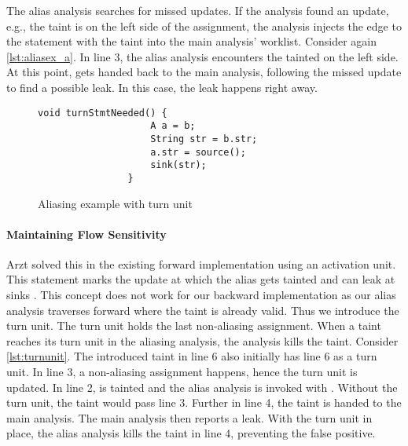 \documentclass[../draft.tex]{subfiles}
\begin{document}
    The alias analysis searches for missed updates. 
    If the analysis found an update, e.g., the taint is on the left side of the assignment, the analysis injects the edge to the statement with the taint into the main analysis' worklist. 
    Consider again \autoref{lst:aliasex_a}. 
    In line 3, the alias analysis encounters the tainted  on the left side. 
    At this point,  gets handed back to the main analysis, following the missed update to find a possible leak. In this case, the leak happens right away.

    \begin{figure}[tbp]
        \centering
        \begin{adjustbox}{max width=\columnwidth}
            \begin{lstlisting}[gobble=16]
                void turnStmtNeeded() {
                    A a = b;
                    String str = b.str;
                    a.str = source();
                    sink(str);
                }
            \end{lstlisting}
        \end{adjustbox}
        \caption{Aliasing example with turn unit}
        \label{lst:turnunit}
    \end{figure}

    \paragraph{Maintaining Flow Sensitivity}
    Arzt solved this in the existing forward implementation using an activation unit.
    This statement marks the update at which the alias gets tainted and can leak at sinks \cite{Arzt2017PhD}. 
    This concept does not work for our backward implementation as our alias analysis traverses forward where the taint is already valid. 
    Thus we introduce the turn unit. 
    The turn unit holds the last non-aliasing assignment. 
    When a taint reaches its turn unit in the aliasing analysis, the analysis kills the taint. 
    Consider \autoref{lst:turnunit}. 
    The introduced taint  in line 6 also initially has line 6 as a turn unit. 
    In line 3, a non-aliasing assignment happens, hence the turn unit is updated. 
    In line 2,  is tainted and the alias analysis is invoked with . 
    Without the turn unit, the taint would pass line 3. 
    Further in line 4, the taint is handed to the main analysis. 
    The main analysis then reports a leak. 
    With the turn unit in place, the alias analysis kills the taint in line 4, preventing the false positive.
    
\end{document}
